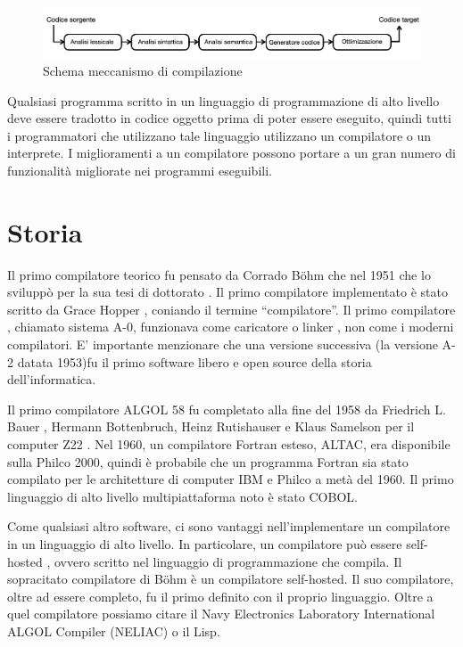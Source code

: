 \documentclass[12pt,a4paper]{report}
\begin{document}
\begin{figure}
\includegraphics[width = \textwidth]{SchemaCompilatore.png}
\caption{Schema meccanismo di compilazione}
\label{Fig:MeccanismoCompilazione}
\end{figure}


Qualsiasi programma scritto in un linguaggio di programmazione di alto livello deve essere tradotto in codice oggetto prima di poter essere eseguito, quindi tutti i programmatori che utilizzano tale linguaggio utilizzano un compilatore o un interprete. I miglioramenti a un compilatore possono portare a un gran numero di funzionalità migliorate nei programmi eseguibili.

\section{Storia}
Il primo compilatore teorico fu pensato da Corrado Böhm che nel 1951 che lo sviluppò per la sua tesi di dottorato . Il primo compilatore implementato è stato scritto da Grace Hopper , coniando il termine ``compilatore''. Il primo compilatore , chiamato sistema A-0,  funzionava come caricatore o linker , non come i moderni compilatori. E' importante menzionare che una versione successiva (la versione A-2 datata 1953)fu il primo software libero e open source della storia dell'informatica.

Il primo compilatore ALGOL 58 fu completato alla fine del 1958 da Friedrich L. Bauer , Hermann Bottenbruch, Heinz Rutishauser e Klaus Samelson per il computer Z22 . 
Nel 1960, un compilatore Fortran esteso, ALTAC, era disponibile sulla Philco 2000, quindi è probabile che un programma Fortran sia stato compilato per le architetture di computer IBM e Philco a metà del 1960.  Il primo linguaggio di alto livello multipiattaforma noto è stato COBOL. 

Come qualsiasi altro software, ci sono vantaggi nell'implementare un compilatore in un linguaggio di alto livello. In particolare, un compilatore può essere self-hosted , ovvero scritto nel linguaggio di programmazione che compila. Il sopracitato compilatore di Böhm è un compilatore self-hosted. Il suo compilatore, oltre ad essere completo, fu il primo definito con il proprio linguaggio.
Oltre a quel compilatore possiamo citare il Navy Electronics Laboratory International ALGOL Compiler (NELIAC) o il Lisp.\\
\end{document}
